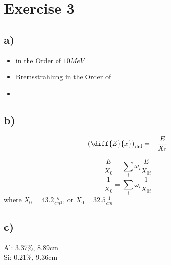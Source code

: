 \documentclass[]{scrartcl}
\begin{document}
\section{Exercise 3}

\subsection{a)}

\begin{itemize}
	\item in the Order of $10MeV$ 
	\item Bremsstrahlung in the Order of 
	\item 
\end{itemize}

\subsection{b)}

$$
\left(\diff{E}{x}\right)_\text{rad} = - \frac{E}{X_0}
$$

$$
\frac{E}{X_0} = \sum_i \omega_i \frac{E}{X_{0i}}
$$
$$
\frac{1}{X_0} = \sum_i \omega_i \frac{1}{X_{0i}}
$$
where $X_0 = 43.2 \frac{g}{cm^2}$, or $X_0 = 32.5 \frac{1}{cm}$. 

\subsection{c)}

Al: 3.37\%, 8.89cm\\
Si: 0.21\%, 9.36cm
\end{document}
